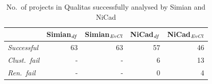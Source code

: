 \documentclass{sig-alternate-05-2015}
\begin{document}
\begin{table}[H]
	\centering
	\caption{No.~of projects in Qualitas successfully analysed by Simian and NiCad}
	\label{tab:projects_missing}
	\small
	\begin{tabular}{l|r|r|r|r}
		\hline
		& Simian$_{\textrm{\textit{df}}}$ & Simian$_{\textrm{\textit{EvCl}}}$  & NiCad$_{\textrm{\textit{df}}}$ & NiCad$_{\textrm{\textit{EvCl}}}$ \\ %
		\hline
		\textit{Successful} & 63 & 63 & 57 & 46 \\ %
		\textit{Clust.~fail} & - & - & 6 & 13 \\
		\textit{Ren.~fail} & - &  - & 0 & 4 \\
		\hline

\end{tabular}
\end{table}
\end{document}
